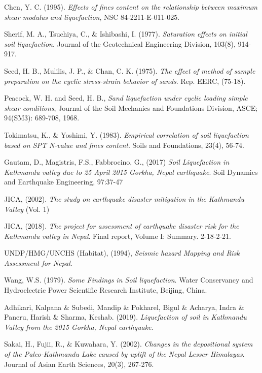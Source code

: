 \begin{thebibliography}{99}
Chen, Y. C. (1995). \emph{Effects of fines content on the relationship between maximum shear modulus and liquefaction}, NSC 84-2211-E-011-025.

Sherif, M. A., Tsuchiya, C., \& Ishibashi, I. (1977). \emph{Saturation effects on initial soil liquefaction}. Journal of the Geotechnical Engineering Division, 103(8), 914-917.

Seed, H. B., Mulilis, J. P., \& Chan, C. K. (1975). \emph{The effect of method of sample preparation on the cyclic stress-strain behavior of sands}. Rep. EERC, (75-18).

Peacock, W. H. and Seed, H. B., \emph{Sand liquefaction under cyclic loading simple shear conditions}, Journal of the Soil Mechanics and Foundations Division, ASCE; 94(SM3): 689-708, 1968.

Tokimatsu, K., \& Yoshimi, Y. (1983). \emph{Empirical correlation of soil liquefaction based on SPT N-value and fines content}. Soils and Foundations, 23(4), 56-74.

Gautam, D., Magistris, F.S., Fabbrocino, G., (2017) \emph{Soil Liquefaction in Kathmandu valley due to 25 April 2015 Gorkha, Nepal earthquake}. Soil Dynamics and Earthquake Engineering, 97:37-47

JICA, (2002). \emph{The study on earthquake disaster mitigation in the Kathmandu Valley} (Vol. 1)

JICA, (2018). \emph{The project for assessment of earthquake disaster risk for the Kathmandu valley in Nepal}. Final report, Volume I: Summary. 2-18-2-21.

UNDP/HMG/UNCHS (Habitat), (1994), \emph{Seismic hazard Mapping and Risk Assessment for Nepal}.

Wang, W.S. (1979). \emph{Some Findings in Soil liquefaction}. Water Conservancy and Hydroelectric Power Scientific Research Institute, Beijing, China.

Adhikari, Kalpana \& Subedi, Mandip \& Pokharel, Bigul \& Acharya, Indra \& Paneru, Harish \& Sharma, Keshab. (2019). \emph{Liquefaction of soil in Kathmandu Valley from the 2015 Gorkha, Nepal earthquake}.

Sakai, H., Fujii, R., \& Kuwahara, Y. (2002). \emph{Changes in the depositional system of the Paleo-Kathmandu Lake caused by uplift of the Nepal Lesser Himalayas}. Journal of Asian Earth Sciences, 20(3), 267-276.


\end{thebibliography}

